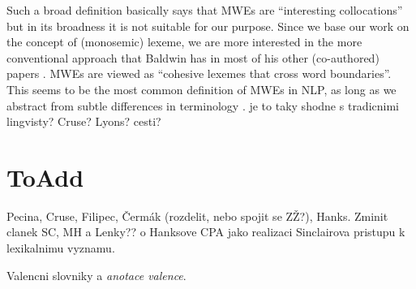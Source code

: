 Such a broad definition basically says that MWEs are ``interesting collocations'' but in its broadness it is not suitable for our purpose. Since we base our work on the concept of (monosemic) lexeme, we are more interested in the more conventional approach that Baldwin has in most of his other (co-authored) papers \citep{baldwin:2003,sag:2002}. MWEs are viewed as ``cohesive lexemes that cross word boundaries''. This seems to be the most common definition of MWEs in NLP, as long as we abstract from subtle differences in terminology \citep{calzolari, copestake, dalsi?}. {\xxx je to taky shodne s tradicnimi lingvisty? Cruse? Lyons? cesti?}


\section{ToAdd}
Pecina, Cruse, Filipec, Čermák (rozdelit, nebo spojit se ZŽ?), Hanks. Zminit clanek SC, MH a Lenky?? o Hanksove CPA jako realizaci Sinclairova pristupu k lexikalnimu vyznamu.

Valencni slovniky a \emph{anotace valence}.